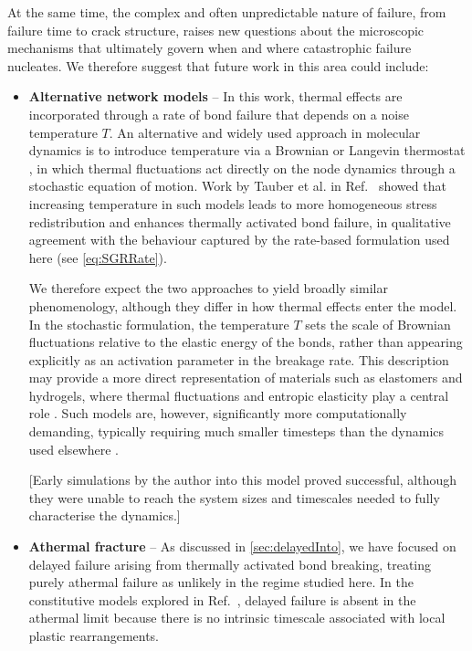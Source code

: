 At the same time, the complex and often unpredictable nature of failure, from failure time to crack structure, raises new questions about the microscopic mechanisms that ultimately govern when and where catastrophic failure nucleates. We therefore suggest that future work in this area could include:
\begin{itemize}
    \item {\bf Alternative network models} -- In this work, thermal effects are incorporated through a rate of bond failure that depends on a noise temperature $T$. An alternative and widely used approach in molecular dynamics is to introduce temperature via a Brownian or Langevin thermostat \cite{allen_computer_2017}, in which thermal fluctuations act directly on the node dynamics through a stochastic equation of motion. Work by Tauber et al. in Ref.~\cite{tauber_role_2020} showed that increasing temperature in such models leads to more homogeneous stress redistribution and enhances thermally activated bond failure, in qualitative agreement with the behaviour captured by the rate-based formulation used here (see \cref{eq:SGRRate}).

    We therefore expect the two approaches to yield broadly similar phenomenology, although they differ in how thermal effects enter the model. In the stochastic formulation, the temperature $T$ sets the scale of Brownian fluctuations relative to the elastic energy of the bonds, rather than appearing explicitly as an activation parameter in the breakage rate. This description may provide a more direct representation of materials such as elastomers and hydrogels, where thermal fluctuations and entropic elasticity play a central role \cite{arruda_three-dimensional_1993,james_theory_1943}. Such models are, however, significantly more computationally demanding, typically requiring much smaller timesteps than the dynamics used elsewhere \cite{leimkuhler_robust_2013}.

    [Early simulations by the author into this model proved successful, although they were unable to reach the system sizes and timescales needed to fully characterise the dynamics.]

    \item {\bf Athermal fracture} -- As discussed in \cref{sec:delayedInto}, we have focused on delayed failure arising from thermally activated bond breaking, treating purely athermal failure as unlikely in the regime studied here. In the constitutive models explored in Ref.~\cite{lockwood_ultradelayed_2025}, delayed failure is absent in the athermal limit because there is no intrinsic timescale associated with local plastic rearrangements.
    

\end{itemize}
